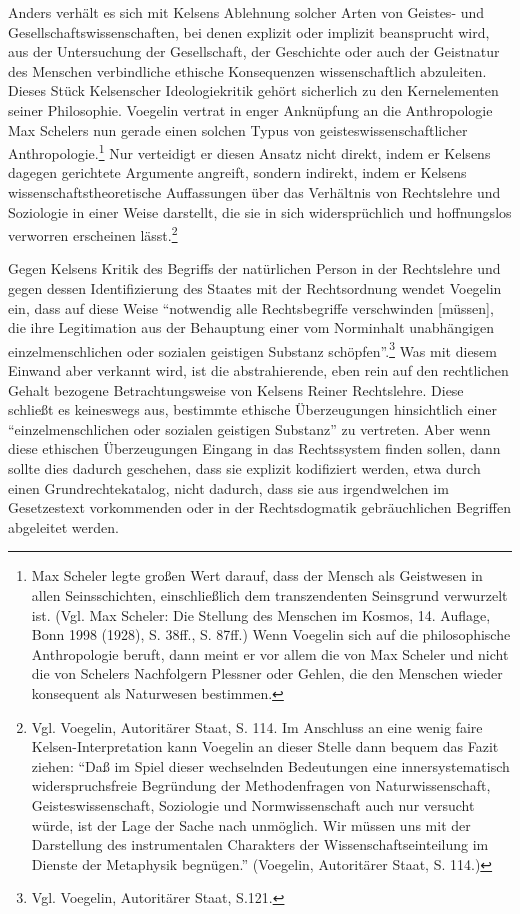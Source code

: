 \documentclass[12pt,a4paper,ngerman]{article}
\begin{document}
Anders verhält es sich mit Kelsens Ablehnung solcher Arten von Geistes- und
Gesellschaftswissenschaften, bei denen explizit oder implizit beansprucht
wird, aus der Untersuchung der Gesellschaft, der Geschichte oder auch der
Geistnatur des Menschen verbindliche ethische Konsequenzen wissenschaftlich
abzuleiten. Dieses Stück Kelsenscher Ideologiekritik gehört sicherlich zu den
Kernelementen seiner Philosophie. Voegelin vertrat in enger Anknüpfung an die
Anthropologie Max Schelers nun gerade einen solchen Typus von
geisteswissenschaftlicher Anthropologie.\footnote{Max Scheler legte großen
  Wert darauf, dass der Mensch als Geistwesen in allen Seinsschichten,
  einschließlich dem transzendenten Seinsgrund verwurzelt ist. (Vgl. Max
  Scheler: Die Stellung des Menschen im Kosmos, 14. Auflage, Bonn 1998 (1928),
  S. 38ff., S. 87ff.) Wenn Voegelin sich auf die philosophische Anthropologie
  beruft, dann meint er vor allem die von Max Scheler und nicht die von
  Schelers Nachfolgern Plessner oder Gehlen, die den Menschen wieder
  konsequent als Naturwesen bestimmen.}  Nur verteidigt er diesen Ansatz nicht
direkt, indem er Kelsens dagegen gerichtete Argumente angreift, sondern
indirekt, indem er Kelsens wissenschaftstheoretische Auffassungen über das
Verhältnis von Rechtslehre und Soziologie in einer Weise darstellt, die sie in
sich widersprüchlich und hoffnungslos verworren erscheinen
lässt.\footnote{Vgl.  Voegelin, Autoritärer Staat, S. 114. Im Anschluss an
  eine wenig faire Kelsen-Interpretation kann Voegelin an dieser Stelle dann
  bequem das Fazit ziehen: "`Daß im Spiel dieser wechselnden Bedeutungen eine
  innersystematisch widerspruchsfreie Begründung der Methodenfragen von
  Naturwissenschaft, Geisteswissenschaft, Soziologie und Normwissenschaft auch
  nur versucht würde, ist der Lage der Sache nach unmöglich. Wir müssen uns
  mit der Darstellung des instrumentalen Charakters der
  Wissenschaftseinteilung im Dienste der Metaphysik begnügen."'  (Voegelin,
  Autoritärer Staat, S. 114.)}

Gegen Kelsens Kritik des Begriffs der natürlichen Person in der Rechtslehre
und gegen dessen Identifizierung des Staates mit der Rechtsordnung wendet
Voegelin ein, dass auf diese Weise "`notwendig alle Rechtsbegriffe
verschwinden [müssen], die ihre Legitimation aus der Behauptung einer vom
Norminhalt unabhängigen einzelmenschlichen oder sozialen geistigen Substanz
schöpfen"'.\footnote{Vgl. Voegelin, Autoritärer Staat, S.121.}  Was mit diesem
Einwand aber verkannt wird, ist die abstrahierende, eben rein auf den
rechtlichen Gehalt bezogene Betrachtungsweise von Kelsens Reiner Rechtslehre.
Diese schließt es keineswegs aus, bestimmte ethische Überzeugungen
hinsichtlich
einer "`einzelmenschlichen oder sozialen geistigen Substanz"' zu vertreten.
Aber wenn diese ethischen Überzeugungen Eingang in das Rechtssystem finden
sollen, dann sollte dies dadurch geschehen, dass sie explizit kodifiziert
werden, etwa durch einen Grundrechtekatalog, nicht dadurch, dass sie aus
irgendwelchen im Gesetzestext vorkommenden oder in der Rechtsdogmatik
gebräuchlichen Begriffen abgeleitet werden.
\end{document}
